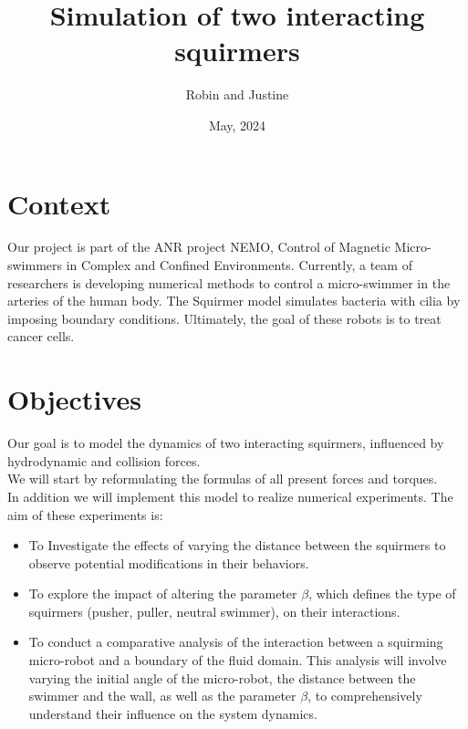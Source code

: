 \documentclass[options]{article}
\begin{document}
\title{Simulation of two interacting squirmers}
\author{Robin and Justine}
\date{May, 2024}
\maketitle

\section{Context}
Our project is part of the ANR project NEMO, Control of Magnetic Micro-swimmers in Complex and Confined Environments.
Currently, a team of researchers is developing numerical methods to control a micro-swimmer in the arteries
of the human body.
The Squirmer model simulates bacteria with cilia by imposing boundary conditions.
Ultimately, the goal of these robots is to treat cancer cells.

\vspace{0.5cm}
\section{Objectives}
Our goal is to model the dynamics of two interacting squirmers, influenced by hydrodynamic \cite{Brumley} and collision forces.\\
We will start by reformulating the formulas of all present forces and torques.\cite{Brumley}\cite{Lauga}\\
In addition we will implement this model to realize numerical experiments. The aim of these experiments is: 
\begin{itemize}
    \item To Investigate the effects of varying the distance between the squirmers to observe
    potential modifications in their behaviors.
    \item To explore the impact of altering the parameter $\beta$, which defines the
    type of squirmers (pusher, puller, neutral swimmer), on their interactions.
    \item To conduct a comparative analysis of the interaction between a squirming micro-robot and a 
    boundary of the fluid domain. This analysis will involve varying the initial angle of the micro-robot, the distance between the swimmer and the wall, as well as the parameter $\beta$, 
    to comprehensively understand their influence on the system dynamics.
\end{itemize}

\newpage
\end{document}

